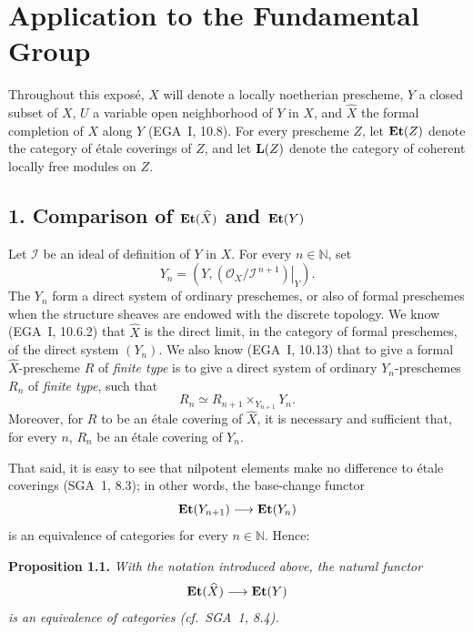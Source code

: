 \makeatletter
\providecommand{\sgareaderlabel}[2]{%
  \begingroup
  \def\@currentlabel{#2}%
  \phantomsection\label{#1}%
  \endgroup}
\makeatother

\chapter{Application to the Fundamental Group}
\label{X}

\medskip
Throughout this expos\'e, $X$ will denote a locally noetherian prescheme,
$Y$ a closed subset of $X$, $U$ a variable open neighborhood of $Y$ in $X$,
and $\widehat X$ the formal completion of $X$ along $Y$
(\textup{EGA}~I, 10.8). For every prescheme $Z$, let $\mathbf{Et}(Z)$ denote the
category of \'etale coverings of $Z$, and let $\mathbf L(Z)$\sgareaderlabel{pX.1}{1} denote the category
of coherent locally free modules on $Z$.

\section*{1. Comparison of $\mathbf{Et}(\widehat X)$ and $\mathbf{Et}(Y)$}
\sgareaderlabel{X.1}{1}

Let $\mathcal I$ be an ideal of definition of $Y$ in $X$. For every
$n\in\mathbb N$, set
\[
  Y_n=\left(Y,\left.(\mathcal O_X/\mathcal I^{\,n+1})\right|_Y\right).
\]
The $Y_n$ form a direct system of ordinary preschemes, or also of formal
preschemes when the structure sheaves are endowed with the discrete topology.
We know (EGA~I, 10.6.2) that $\widehat X$ is the direct limit, in the category
of formal preschemes, of the direct system $(Y_n)$. We also know (EGA~I,
10.13) that to give a formal $\widehat X$-prescheme $R$ of \emph{finite type}
is to give a direct system of ordinary $Y_n$-preschemes $R_n$ of
\emph{finite type}, such that
\[
  R_n\simeq R_{n+1}\times_{Y_{n+1}}Y_n.
\]
Moreover, for $R$ to be an étale covering of $\widehat X$, it is necessary
and sufficient that, for every $n$, $R_n$ be an étale covering of $Y_n$.

That said, it is easy to see that nilpotent elements make no difference to
étale coverings (SGA~1, 8.3); in other words, the base-change functor
\[
  \mathbf{Et}(Y_{n+1})\longrightarrow\mathbf{Et}(Y_n)
\]
is an equivalence of categories for every $n\in\mathbb N$. Hence:

\medskip
\sgareaderlabel{X.1.1}{1.1}\noindent\textbf{Proposition 1.1.}\quad
\emph{With the notation introduced above, the natural functor
\[
  \mathbf{Et}(\widehat X)\longrightarrow\mathbf{Et}(Y)
\]
is an equivalence of categories (cf.\ SGA~1, 8.4).}


